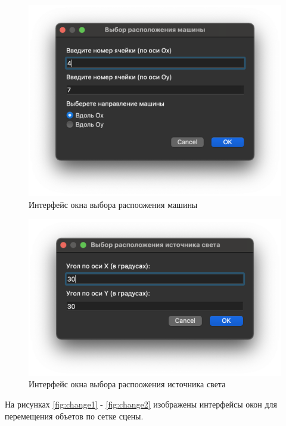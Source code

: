 \documentclass[a4paper,14pt, unknownkeysallowed]{extreport}
\begin{document}
\begin{figure}[h]
	\centering
	\includegraphics[scale=0.65]{img/car.png}
	\caption{Интерфейс окна выбора распоожения машины}
	\label{fig:car}
\end{figure} 

\begin{figure}[h]
	\centering
	\includegraphics[scale=0.65]{img/illuminant.png}
	\caption{Интерфейс окна выбора распоожения источника света}
	\label{fig:illuminant}
\end{figure} 

\clearpage

На рисунках \ref{fig:change1} - \ref{fig:change2} изображены интерфейсы окон для перемещения  объетов по сетке сцены. 
\end{document}
